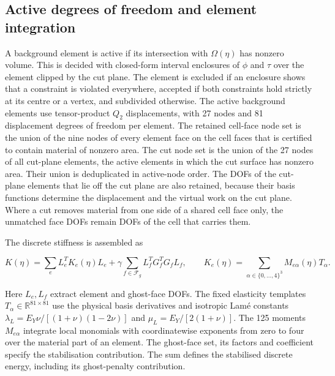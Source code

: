 \documentclass[preprint,12pt,authoryear]{elsarticle}
\begin{document}
\subsection{Active degrees of freedom and element integration}

A background element is active if its intersection with \(\Omega(\eta)\) has nonzero volume. This is decided with closed-form interval enclosures of \(\phi\) and \(\tau\) over the element clipped by the cut plane. The element is excluded if an enclosure shows that a constraint is violated everywhere, accepted if both constraints hold strictly at its centre or a vertex, and subdivided otherwise. The active background elements use tensor-product \(Q_2\) displacements, with 27 nodes and 81 displacement degrees of freedom per element. The retained cell-face node set is the union of the nine nodes of every element face on the cell faces that is certified to contain material of nonzero area. The cut node set is the union of the 27 nodes of all cut-plane elements, the active elements in which the cut surface has nonzero area. Their union is deduplicated in active-node order. The DOFs of the cut-plane elements that lie off the cut plane are also retained, because their basis functions determine the displacement and the virtual work on the cut plane. Where a cut removes material from one side of a shared cell face only, the unmatched face DOFs remain DOFs of the cell that carries them.

The discrete stiffness is assembled as

\[
K(\eta)=\sum_e L_e^TK_e(\eta)L_e
 +\gamma\sum_{f\in\mathcal F_g}L_f^TG_f^TG_fL_f,
\qquad
K_e(\eta)=\sum_{\alpha\in\{0,\ldots,4\}^3}M_{e\alpha}(\eta)T_\alpha.
\tag{A.1}
\]

Here \(L_e,L_f\) extract element and ghost-face DOFs. The fixed elasticity templates \(T_\alpha\in\mathbb R^{81\times81}\) use the physical basis derivatives and isotropic Lamé constants \(\lambda_L=E_Y\nu/[(1+\nu)(1-2\nu)]\) and \(\mu_L=E_Y/[2(1+\nu)]\). The 125 moments \(M_{e\alpha}\) integrate local monomials with coordinatewise exponents from zero to four over the material part of an element. The ghost-face set, its factors and coefficient specify the stabilisation contribution. The sum defines the stabilised discrete energy, including its ghost-penalty contribution.
\end{document}
